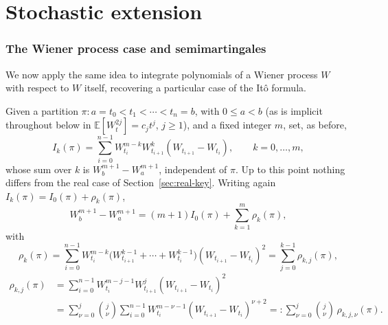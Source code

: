\documentclass[11pt,fleqn]{article}
\def\E{\mathbb E}
\def\bin#1#2{{#1\choose#2}}
\def\ds{\displaystyle}
\theoremstyle{plain}
\theoremstyle{remark}
\begin{document}
\part{Stochastic extension}

\section{The Wiener process case and semimartingales}\label{sec:realWiener}

We now apply the same idea to integrate polynomials of a Wiener process
$W$ with respect to $W$ itself, recovering a particular case of the It\^o
formula.

Given a partition $\pi\colon a=t_0<t_1<\cdots<t_n=b$, with $0\le a<b$ (as
is implicit throughout below in $\E[W_t^{2j}]=c_jt^j$, $j\ge1$), and a
fixed integer
$m$, set, as before,
\[
I_k(\pi)=\ds\sum_{i=0}^{n-1}W_{t_i}^{m-k}W_{t_{i+1}}^k(W_{t_{i+1}}-W_{t_i}),
\qquad k=0,\ldots,m,
\]
whose sum over $k$ is $W_b^{m+1}-W_a^{m+1}$, independent of $\pi$. Up to
this point nothing differs from the real case of
Section~\ref{sec:real-key}. Writing again
$I_k(\pi)=I_0(\pi)+\rho_k(\pi)$,
\begin{equation}\label{eq:e3}
W_b^{m+1}-W_a^{m+1}=(m+1)I_0(\pi)+\sum_{k=1}^m\rho_k(\pi),
\end{equation}
with
\[
\rho_k(\pi)=\sum_{i=0}^{n-1}W_{t_i}^{m-k}
\big(W_{t_{i+1}}^{k-1}+\cdots+W_{t_i}^{k-1}\big)(W_{t_{i+1}}-W_{t_i})^2
=\sum_{j=0}^{k-1}\rho_{k,j}(\pi),
\]
\begin{align*}
\rho_{k,j}(\pi)&=\sum_{i=0}^{n-1}W_{t_i}^{m-j-1}W_{t_{i+1}}^j(W_{t_{i+1}}-W_{t_i})^2\\
&=\sum_{\nu=0}^j\bin j\nu\sum_{i=0}^{n-1}W_{t_i}^{m-\nu-1}(W_{t_{i+1}}-W_{t_i})^{\nu+2}
=:\sum_{\nu=0}^j\bin j\nu\,\rho_{k,j,\nu}(\pi).
\end{align*}
\end{document}
